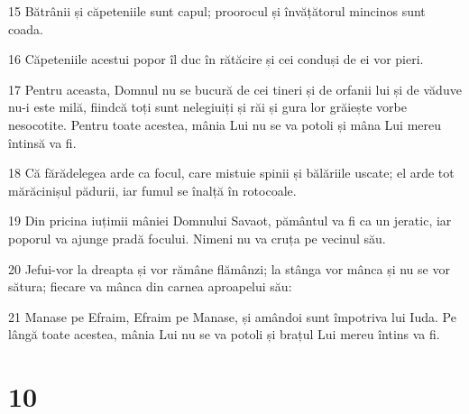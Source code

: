 \par 15 Bătrânii și căpeteniile sunt capul; proorocul și învățătorul mincinos sunt coada.
\par 16 Căpeteniile acestui popor îl duc în rătăcire și cei conduși de ei vor pieri.
\par 17 Pentru aceasta, Domnul nu se bucură de cei tineri și de orfanii lui și de văduve nu-i este milă, fiindcă toți sunt nelegiuiți și răi și gura lor grăiește vorbe nesocotite. Pentru toate acestea, mânia Lui nu se va potoli și mâna Lui mereu întinsă va fi.
\par 18 Că fărădelegea arde ca focul, care mistuie spinii și bălăriile uscate; el arde tot mărăcinișul pădurii, iar fumul se înalță în rotocoale.
\par 19 Din pricina iuțimii mâniei Domnului Savaot, pământul va fi ca un jeratic, iar poporul va ajunge pradă focului. Nimeni nu va cruța pe vecinul său.
\par 20 Jefui-vor la dreapta și vor rămâne flămânzi; la stânga vor mânca și nu se vor sătura; fiecare va mânca din carnea aproapelui său:
\par 21 Manase pe Efraim, Efraim pe Manase, și amândoi sunt împotriva lui Iuda. Pe lângă toate acestea, mânia Lui nu se va potoli și brațul Lui mereu întins va fi.

\chapter{10}

